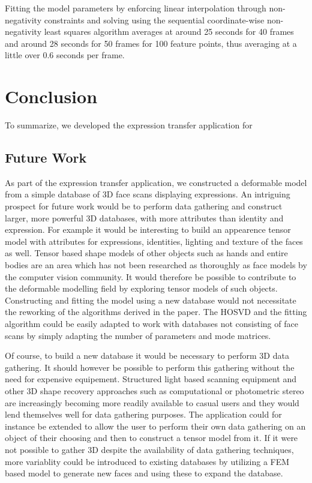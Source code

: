 \documentclass[11pt,a4paper]{report}
\begin{document}
Fitting the model parameters by enforcing linear interpolation through
non-negativity constraints and solving using the sequential coordinate-wise
non-negativity least squares algorithm averages at around 25 seconds for 40
frames and around 28 seconds for 50 frames for 100 feature points, thus averaging at a little over 0.6
seconds per frame. 

\chapter{Conclusion}
To summarize, we developed the expression transfer application for 
\section{Future Work}
As part of the expression transfer application, we constructed a deformable model from a simple database of 3D face scans displaying
expressions. An intriguing prospect for future work would be to perform data
gathering and construct larger, more powerful 3D databases,
with more attributes than identity and expression. For example it would be
interesting to build an appearence tensor model with attributes for expressions,
identities, lighting and texture of the faces as well. Tensor based shape models of other objects
such as hands and entire bodies are an area which has not been researched as
thoroughly as face models by the computer vision community. It would therefore
be possible to contribute to the deformable modelling field by exploring tensor models
of such objects. Constructing and fitting the model using a new database would not necessitate the reworking of the algorithms derived in the
paper. The HOSVD and the fitting algorithm could be easily adapted to work with
databases not consisting of face scans by simply adapting the number of
parameters and mode matrices. 

Of course, to build a new database it would be necessary to perform 3D data
gathering. It should however be possible to perform this gathering without the
need for expensive equipement. Structured light based scanning equipment and other 3D shape recovery approaches
such as computational or photometric stereo are increasingly becoming more readily
available to casual users and they would lend themselves well for data gathering
purposes. The application could for instance be extended to allow the user to
perform their own data gathering on an object of their choosing and then to
construct a tensor model from it. If it were not possible to gather 3D despite the availability of data gathering techniques,
more variablity could be introduced to existing databases by utilizing a FEM based
model to generate new faces and using these to expand the database.
\end{document}
